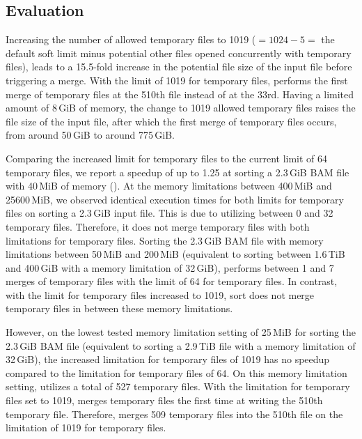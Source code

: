 \subsection{Evaluation}
Increasing the number of allowed temporary files to 1019 ($=1024-5 =$  the default soft limit minus potential other files opened concurrently with temporary files), leads to a 15.5-fold increase in the potential file size of the input file before triggering a merge. With the limit of 1019 for temporary files, \sort performs the first merge of temporary files at the 510th file instead of at the 33rd. Having a limited amount of 8\,GiB of memory, the change to 1019 allowed temporary files raises the file size of the input file, after which the first merge of temporary files occurs, from around 50\,GiB to around 775\,GiB.

Comparing the increased limit for temporary files to the current limit of 64 temporary files, we report a speedup of up to 1.25 at sorting a 2.3\,GiB BAM file with 40\,MiB of memory ().
At the memory limitations between 400\,MiB and 25600\,MiB, we observed identical execution times for both limits for temporary files on sorting a 2.3\,GiB input file. This is due to \sort utilizing between 0 and 32 temporary files. Therefore, it does not merge temporary files with both limitations for temporary files.
Sorting the 2.3\,GiB BAM file with memory limitations between 50\,MiB and 200\,MiB (equivalent to sorting between 1.6\,TiB and 400\,GiB with a memory limitation of 32\,GiB), \sort performs between 1 and 7 merges of temporary files with the limit of 64 for temporary files. In contrast, with the limit for temporary files increased to 1019, sort does not merge temporary files in between these memory limitations. 

However, on the lowest tested memory limitation setting of 25\,MiB for sorting the 2.3\,GiB BAM file (equivalent to sorting a 2.9\,TiB file with a memory limitation of 32\,GiB), the increased limitation for temporary files of 1019 has no speedup compared to the limitation for temporary files of 64. On this memory limitation setting, \sort utilizes a total of 527 temporary files. With the limitation for temporary files set to 1019, \sort merges temporary files the first time at writing the 510th temporary file. Therefore, \sort merges 509 temporary files into the 510th file on the limitation of 1019 for temporary files.

